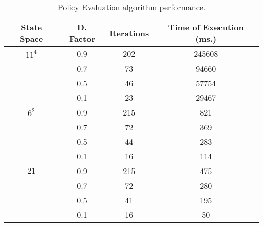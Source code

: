 \documentclass[a4paper,11pt]{article}
\begin{document}
\begin{table}[h!]
\caption{Policy Evaluation algorithm performance.}
\label{peap}
\begin{center}
\begin{tabular}{c@{ }@{ }c@{ }@{ }c@{ }@{ }c}
\textbf{State Space} & \textbf{D. Factor} & \textbf{Iterations} & \textbf{Time of Execution (ms.)} \\
\midrule
$11^{4}$ 		& 0.9 				& 202 				& 245608 \\
				& 0.7 				& 73 				& 94660 	 \\
 				& 0.5 				& 46 				& 57754 	 \\
 				& 0.1 				& 23 				& 29467 \vspace{0.1cm} \\ 
$6^{2}$			& 0.9 				& 215 				& 821 	 \\ 
				& 0.7 				& 72 				& 369  \\
				& 0.5 				& 44 				& 283 	 \\
				& 0.1 				& 16 				& 114 	\vspace{0.1cm}  \\ 
$21$ 			& 0.9 				& 215 				& 475  \\ 
	 			& 0.7 				& 72 				& 280  \\
	 			& 0.5 				& 41 				& 195  \\
	 			& 0.1 				& 16 				& 50  \\
\end{tabular}
\end{center}
\end{table}



\newpage
\end{document}
